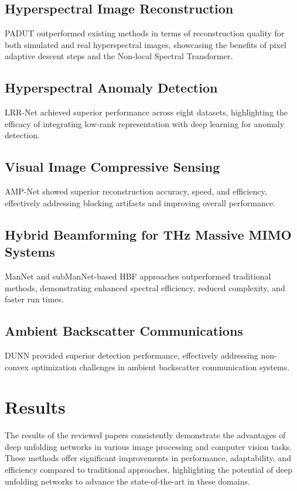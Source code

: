 \documentclass[11pt]{article}
\begin{document}
\subsection{Hyperspectral Image Reconstruction}
PADUT outperformed existing methods in terms of reconstruction quality for both simulated and real hyperspectral images, showcasing the benefits of pixel adaptive descent steps and the Non-local Spectral Transformer.

\subsection{Hyperspectral Anomaly Detection}
LRR-Net achieved superior performance across eight datasets, highlighting the efficacy of integrating low-rank representation with deep learning for anomaly detection.

\subsection{Visual Image Compressive Sensing}
AMP-Net showed superior reconstruction accuracy, speed, and efficiency, effectively addressing blocking artifacts and improving overall performance.

\subsection{Hybrid Beamforming for THz Massive MIMO Systems}
ManNet and subManNet-based HBF approaches outperformed traditional methods, demonstrating enhanced spectral efficiency, reduced complexity, and faster run times.

\subsection{Ambient Backscatter Communications}
DUNN provided superior detection performance, effectively addressing non-convex optimization challenges in ambient backscatter communication systems.

\section{Results}
The results of the reviewed papers consistently demonstrate the advantages of deep unfolding networks in various image processing and computer vision tasks. These methods offer significant improvements in performance, adaptability, and efficiency compared to traditional approaches, highlighting the potential of deep unfolding networks to advance the state-of-the-art in these domains.
\end{document}
